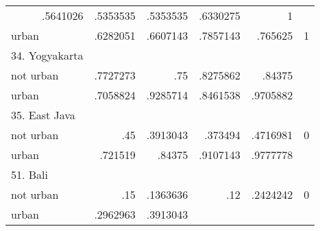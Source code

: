 \begin{table}[!h]
\begin{tabular}{llllll}
  \multicolumn{1}{|r}{.5641026} &
  \multicolumn{1}{r}{.5353535} &
  \multicolumn{1}{r}{.5353535} &
  \multicolumn{1}{r}{.6330275} &
  \multicolumn{1}{r}{1} \\
\multicolumn{1}{l}{\hspace{1em}urban} &
  \multicolumn{1}{|r}{.6282051} &
  \multicolumn{1}{r}{.6607143} &
  \multicolumn{1}{r}{.7857143} &
  \multicolumn{1}{r}{.765625} &
  \multicolumn{1}{r}{1} \\
\multicolumn{1}{l}{34. Yogyakarta} &
  \multicolumn{1}{|r}{} &
  \multicolumn{1}{r}{} &
  \multicolumn{1}{r}{} &
  \multicolumn{1}{r}{} &
  \multicolumn{1}{r}{} \\
\multicolumn{1}{l}{\hspace{1em}not urban} &
  \multicolumn{1}{|r}{.7727273} &
  \multicolumn{1}{r}{.75} &
  \multicolumn{1}{r}{.8275862} &
  \multicolumn{1}{r}{.84375} &
  \multicolumn{1}{r}{} \\
\multicolumn{1}{l}{\hspace{1em}urban} &
  \multicolumn{1}{|r}{.7058824} &
  \multicolumn{1}{r}{.9285714} &
  \multicolumn{1}{r}{.8461538} &
  \multicolumn{1}{r}{.9705882} &
  \multicolumn{1}{r}{} \\
\multicolumn{1}{l}{35. East Java} &
  \multicolumn{1}{|r}{} &
  \multicolumn{1}{r}{} &
  \multicolumn{1}{r}{} &
  \multicolumn{1}{r}{} &
  \multicolumn{1}{r}{} \\
\multicolumn{1}{l}{\hspace{1em}not urban} &
  \multicolumn{1}{|r}{.45} &
  \multicolumn{1}{r}{.3913043} &
  \multicolumn{1}{r}{.373494} &
  \multicolumn{1}{r}{.4716981} &
  \multicolumn{1}{r}{0} \\
\multicolumn{1}{l}{\hspace{1em}urban} &
  \multicolumn{1}{|r}{.721519} &
  \multicolumn{1}{r}{.84375} &
  \multicolumn{1}{r}{.9107143} &
  \multicolumn{1}{r}{.9777778} &
  \multicolumn{1}{r}{} \\
\multicolumn{1}{l}{51. Bali} &
  \multicolumn{1}{|r}{} &
  \multicolumn{1}{r}{} &
  \multicolumn{1}{r}{} &
  \multicolumn{1}{r}{} &
  \multicolumn{1}{r}{} \\
\multicolumn{1}{l}{\hspace{1em}not urban} &
  \multicolumn{1}{|r}{.15} &
  \multicolumn{1}{r}{.1363636} &
  \multicolumn{1}{r}{.12} &
  \multicolumn{1}{r}{.2424242} &
  \multicolumn{1}{r}{0} \\
\multicolumn{1}{l}{\hspace{1em}urban} &
  \multicolumn{1}{|r}{.2962963} &
  \multicolumn{1}{r}{.3913043} &

\end{tabular}
\end{table}
